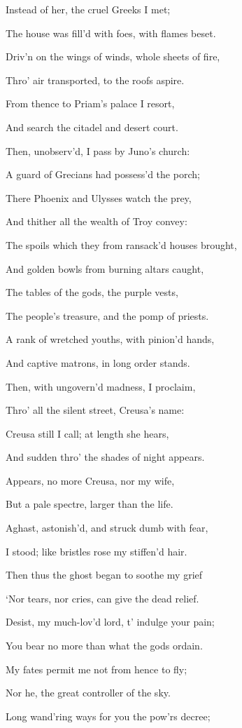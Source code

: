 Instead of her, the cruel Greeks I met;

The house was fill’d with foes, with flames beset.

Driv’n on the wings of winds, whole sheets of fire,

Thro’ air transported, to the roofs aspire.

From thence to Priam’s palace I resort,

And search the citadel and desert court.

Then, unobserv’d, I pass by Juno’s church:

A guard of Grecians had possess’d the porch;

There Phoenix and Ulysses watch the prey,

And thither all the wealth of Troy convey:

The spoils which they from ransack’d houses brought,

And golden bowls from burning altars caught,

The tables of the gods, the purple vests,

The people’s treasure, and the pomp of priests.

A rank of wretched youths, with pinion’d hands,

And captive matrons, in long order stands.

Then, with ungovern’d madness, I proclaim,

Thro’ all the silent street, Creusa’s name:

Creusa still I call; at length she hears,

And sudden thro’ the shades of night appears.

Appears, no more Creusa, nor my wife,

But a pale spectre, larger than the life.

Aghast, astonish’d, and struck dumb with fear,

I stood; like bristles rose my stiffen’d hair.

Then thus the ghost began to soothe my grief

‘Nor tears, nor cries, can give the dead relief.

Desist, my much-lov’d lord, t’ indulge your pain;

You bear no more than what the gods ordain.

My fates permit me not from hence to fly;

Nor he, the great controller of the sky.

Long wand’ring ways for you the pow’rs decree;

